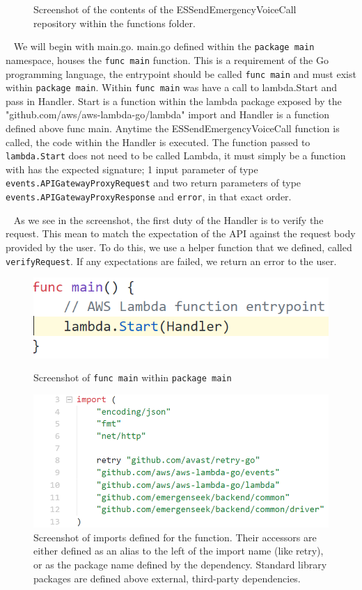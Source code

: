\documentclass[10pt, a4paper]{article}
\begin{document}
\begin{figure}[H]
  \caption{Screenshot of the contents of the ESSendEmergencyVoiceCall repository within the functions folder.}
\endminipage
\end{figure}

\par ~ We will begin with main.go. main.go defined within the \texttt{package main} namespace, houses the \texttt{func main} function. This is a requirement of the Go programming language, the entrypoint should be called \texttt{func main} and must exist within \texttt{package main}. Within \texttt{func main} was have a call to lambda.Start and pass in Handler. Start is a function within the lambda package exposed by the "github.com/aws/aws-lambda-go/lambda" import and Handler is a function defined above func main. Anytime the ESSendEmergencyVoiceCall function is called, the code within the Handler is executed. The function passed to \texttt{lambda.Start} does not need to be called Lambda, it must simply be a function with has the expected signature; 1 input parameter of type \texttt{events.APIGatewayProxyRequest} and two return parameters of type \texttt{events.APIGatewayProxyResponse} and \texttt{error}, in that exact order.

\par ~ As we see in the screenshot, the first duty of the Handler is to verify the request. This mean to match the expectation of the API against the request body provided by the user. To do this, we use a helper function that we defined, called \texttt{verifyRequest}. If any expectations are failed, we return an error to the user. 

\begin{figure}[H]
  \includegraphics[width=\linewidth]{code-screenshots/four.png}
  \caption{Screenshot of \texttt{func main} within \texttt{package main}}
\endminipage\hfill
{}
  \includegraphics[width=\linewidth]{code-screenshots/seven.png}
  \caption{Screenshot of imports defined for the function. Their accessors are either defined as an alias to the left of the import name (like retry), or as the package name defined by the dependency. Standard library packages are defined above external, third-party dependencies.}
\endminipage\hfill
\end{figure}
\end{document}
